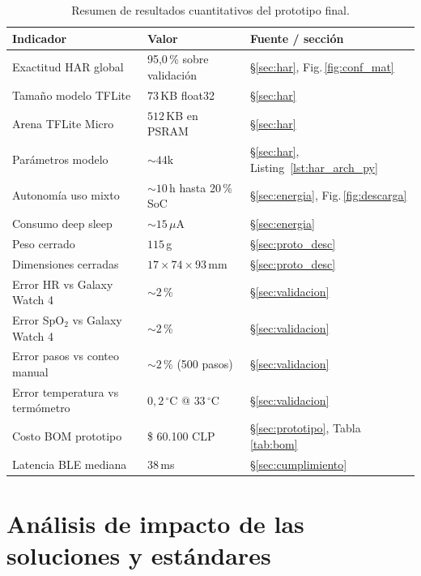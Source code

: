 \documentclass[letterpaper,11pt]{article}
\newcommand{\rfigura}[1]{Fig.\,\ref{#1}}
\newcommand{\rtabla}[1]{Tabla\,\ref{#1}}
\begin{document}
\begin{table}[H]
    \centering
    \caption{Resumen de resultados cuantitativos del prototipo final.}
    \label{tab:resultados_finales}
    \footnotesize
    \begin{tabular}{|L{4.5cm}|L{5.5cm}|L{4.0cm}|}\hline
    \textbf{Indicador} & \textbf{Valor} & \textbf{Fuente / secci\'on} \\\hline
    Exactitud HAR global & 95{,}0\,\% sobre validaci\'on & \S\ref{sec:har}, \rfigura{fig:conf_mat} \\\hline
    Tama\~no modelo TFLite & $73$\,KB float32 & \S\ref{sec:har} \\\hline
    Arena TFLite Micro & $512$\,KB en PSRAM & \S\ref{sec:har} \\\hline
    Par\'ametros modelo & $\sim 44$k & \S\ref{sec:har}, Listing~\ref{lst:har_arch_py} \\\hline
    Autonom\'ia uso mixto & $\sim 10$\,h hasta 20\,\% SoC & \S\ref{sec:energia}, \rfigura{fig:descarga} \\\hline
    Consumo deep sleep & $\sim 15\,\mu$A & \S\ref{sec:energia} \\\hline
    Peso cerrado & $115$\,g & \S\ref{sec:proto_desc} \\\hline
    Dimensiones cerradas & $17\times 74\times 93$\,mm & \S\ref{sec:proto_desc} \\\hline
    Error HR vs Galaxy Watch 4 & $\sim 2$\,\% & \S\ref{sec:validacion} \\\hline
    Error SpO$_2$ vs Galaxy Watch 4 & $\sim 2$\,\% & \S\ref{sec:validacion} \\\hline
    Error pasos vs conteo manual & $\sim 2$\,\% (500 pasos) & \S\ref{sec:validacion} \\\hline
    Error temperatura vs term\'ometro & $0{,}2\,^\circ$C @ $33\,^\circ$C & \S\ref{sec:validacion} \\\hline
    Costo BOM prototipo & \$ 60.100 CLP & \S\ref{sec:prototipo}, \rtabla{tab:bom} \\\hline
    Latencia BLE mediana & $38$\,ms & \S\ref{sec:cumplimiento} \\\hline
    \end{tabular}
\end{table}

\newpage

\section{An\'alisis de impacto de las soluciones y est\'andares}\label{sec:impacto}
\end{document}
